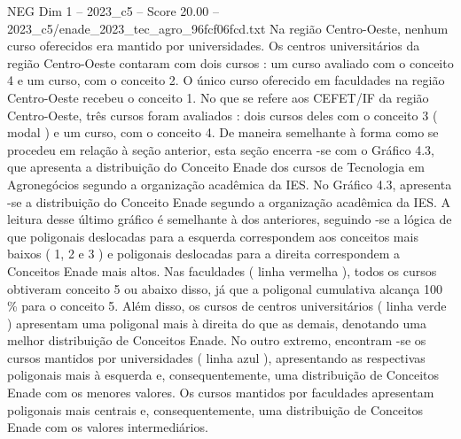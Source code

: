 \begin{textsample}{NEG Dim 1 – 2023\_c5 – Score 20.00 – 2023\_c5/enade\_2023\_tec\_agro\_96fcf06fcd.txt}
Na região Centro-Oeste, nenhum curso oferecidos era mantido por universidades.
Os centros universitários da região Centro-Oeste contaram com dois cursos : um curso avaliado com o conceito 4 e um curso, com o conceito 2.
O único curso oferecido em faculdades na região Centro-Oeste recebeu o conceito 1.
No que se refere aos CEFET/IF da região Centro-Oeste, três cursos foram avaliados : dois cursos deles com o conceito 3 ( modal ) e um curso, com o conceito 4.
De maneira semelhante à forma como se procedeu em relação à seção anterior, esta seção encerra -se com o Gráfico 4.3, que apresenta a distribuição do Conceito Enade dos cursos de Tecnologia em Agronegócios segundo a organização acadêmica da IES.
No Gráfico 4.3, apresenta -se a distribuição do Conceito Enade segundo a organização acadêmica da IES.
A leitura desse último gráfico é semelhante à dos anteriores, seguindo -se a lógica de que poligonais deslocadas para a esquerda correspondem aos conceitos mais baixos ( 1, 2 e 3 ) e poligonais deslocadas para a direita correspondem a Conceitos Enade mais altos.
Nas faculdades ( linha vermelha ), todos os cursos obtiveram conceito 5 ou abaixo disso, já que a poligonal cumulativa alcança 100 \% para o conceito 5.
Além disso, os cursos de centros universitários ( linha verde ) apresentam uma poligonal mais à direita do que as demais, denotando uma melhor distribuição de Conceitos Enade.
No outro extremo, encontram -se os cursos mantidos por universidades ( linha azul ), apresentando as respectivas poligonais mais à esquerda e, consequentemente, uma distribuição de Conceitos Enade com os menores valores.
Os cursos mantidos por faculdades apresentam poligonais mais centrais e, consequentemente, uma distribuição de Conceitos Enade com os valores intermediários.

\end{textsample}
